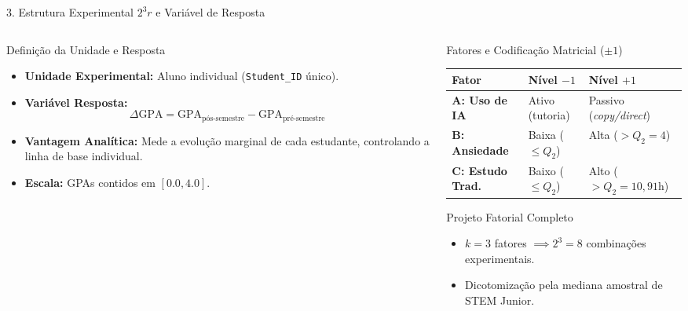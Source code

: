 \documentclass[aspectratio=169, 10pt]{beamer}
\begin{document}
\begin{frame}{3. Estrutura Experimental $2^3 r$ e Variável de Resposta}
    \begin{columns}[T]
        \begin{column}{0.48\textwidth}
            \begin{block}{Definição da Unidade e Resposta}
                \begin{itemize}\setlength{\itemsep}{6pt}
                    \item \textbf{Unidade Experimental:} Aluno individual (\texttt{Student\_ID} único).
                    \item \textbf{Variável Resposta:}
                    $$\Delta \text{GPA} = \text{GPA}_{\text{pós-semestre}} - \text{GPA}_{\text{pré-semestre}}$$
                    \item \textbf{Vantagem Analítica:} Mede a evolução marginal de cada estudante, controlando a linha de base individual.
                    \item \textbf{Escala:} GPAs contidos em $[0.0, 4.0]$.
                \end{itemize}
            \end{block}
        \end{column}

        \begin{column}{0.48\textwidth}
            \begin{block}{Fatores e Codificação Matricial ($\pm 1$)}
                \centering \small
                \begin{tabular}{lll}
                    \toprule
                    \textbf{Fator} & \textbf{Nível $-1$} & \textbf{Nível $+1$} \\
                    \midrule
                    \textbf{A: Uso de IA} & Ativo (tutoria) & Passivo (\textit{copy/direct}) \\
                    \textbf{B: Ansiedade} & Baixa ($\le Q_2$) & Alta ($> Q_2=4$) \\
                    \textbf{C: Estudo Trad.} & Baixo ($\le Q_2$) & Alto ($> Q_2=10,91\text{h}$) \\
                    \bottomrule
                \end{tabular}
            \end{block}

            \begin{exampleblock}{Projeto Fatorial Completo}
                \begin{itemize}
                    \item $k = 3$ fatores $\implies 2^3 = 8$ combinações experimentais.
                    \item Dicotomização pela mediana amostral de STEM Junior.
                \end{itemize}
            \end{exampleblock}
        \end{column}
    \end{columns}
\end{frame}
\end{document}
